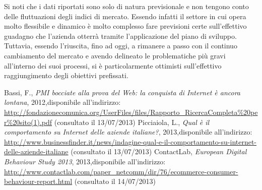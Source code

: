 Si noti che i dati riportati sono solo di natura previsionale e non tengono conto delle fluttuazioni degli indici di mercato. Essendo infatti il settore in cui opera \customer molto flessibile e dinamico è molto complesso fare previsioni certe sull'effettivo guadagno che l'azienda otterrà tramite l'applicazione del piano di sviluppo. Tuttavia, essendo l'\customer riuscita, fino ad oggi, a rimanere a passo con il continuo cambiamento del mercato e avendo delineato le problematiche più gravi all'interno dei suoi processi, si è particolarmente ottimisti sull'effettivo raggiungimento degli obiettivi prefissati.








\begin{thebibliography}{9}
   Bassi, F., \textit{PMI bocciate alla prova del Web: la conquista di Internet è ancora lontana}, 2012,\newline disponibile all'indirizzo: \url{http://fondazionecomunica.org/UserFiles/files/Rapporto_RicercaCompleta%20per%20sito(1).pdf} (consultato il 13/07/2013)
   Picciaiola, L., \textit{Qual è il comportamento su Internet delle aziende italiane?}, 2013,\newline disponibile all'indirizzo: \url{http://www.businessfinder.it/news/indagine-qual-e-il-comportamento-su-internet-delle-aziende-italiane} (consultato il 13/07/2013)
   ContactLab, \textit{European Digital Behaviour Study 2013}, 2013,\newline disponibile all'indirizzo: \url{http://www.contactlab.com/paper_netcomm/dir/76/ecommerce-consumer-behaviour-report.html} (consultato il 14/07/2013)
\end{thebibliography}



